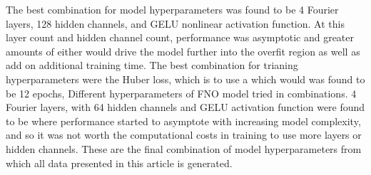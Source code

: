 \documentclass[preprint,review,12pt]{elsarticle}
\begin{document}
The best combination for model hyperparameters was found to be 4 Fourier layers, 128 hidden channels, and GELU nonlinear activation function. At this layer count and hidden channel count, performance was asymptotic and greater amounts of either would drive the model further into the overfit region as well as add on additional training time. The best combination for trianing hyperparameters were the Huber loss, which is to use a which would was found to be 12 epochs, Different hyperparameters of FNO model tried in combinations. 4 Fourier layers, with 64 hidden channels and GELU activation function were found to be where performance started to asymptote with increasing model complexity, and so it was not worth the computational costs in training to use more layers or hidden channels. These are the final combination of model hyperparameters from which all data presented in this article is generated.

\end{document}
